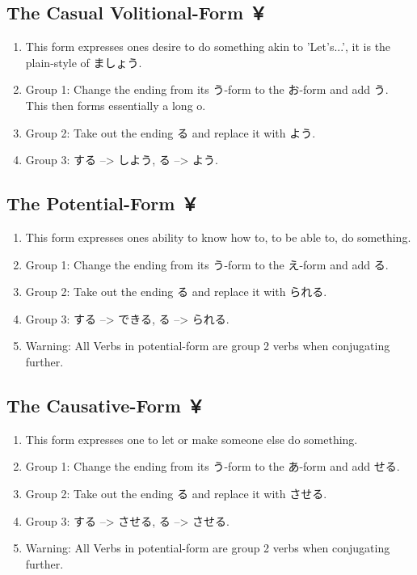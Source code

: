 \documentclass{article}
\newcommand\tabyon[1][0.4cm]{\hspace*{#1}}
\begin{document}
\subsection{The Casual Volitional-Form ￥}
\begin{enumerate}
\item This form expresses ones desire to do something akin to 'Let's...',
 it is the plain-style of ましょう.
\item Group 1: Change the ending from its う-form to the お-form and add う.
This then forms essentially a long o.
\item Group 2: Take out the ending る and replace it with よう.
\item Group 3: する --> しよう, \tabyon {}る --> よう.
\end{enumerate}
\subsection{The Potential-Form ￥}
\begin{enumerate}
\item This form expresses ones ability to know how to, to be able to, do something.
\item Group 1: Change the ending from its う-form to the え-form and add る.
\item Group 2: Take out the ending る and replace it with られる.
\item Group 3: する --> できる, \tabyon {}る --> られる.
\item Warning: All Verbs in potential-form are group 2 verbs when conjugating further.
\end{enumerate}
\subsection{The Causative-Form ￥}	
\begin{enumerate}
\item This form expresses one to let or make someone else do something.
\item Group 1: Change the ending from its う-form to the あ-form and add せる.
\item Group 2: Take out the ending る and replace it with させる.
\item Group 3: する --> させる, \tabyon {}る --> させる.
\item Warning: All Verbs in potential-form are group 2 verbs when conjugating further.
\end{enumerate}
\end{document}
